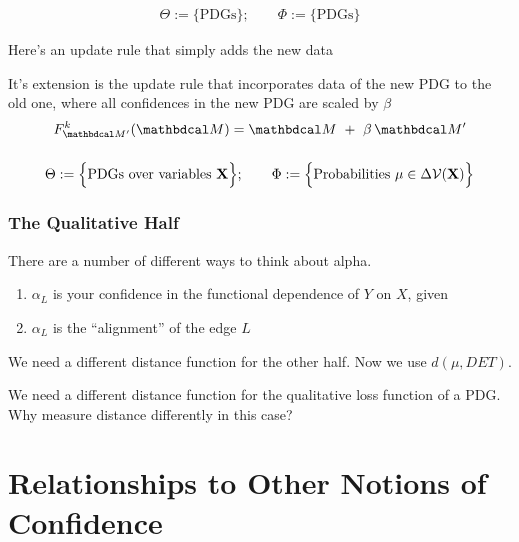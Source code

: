 \documentclass{article}
\begin{document}
\subsubsection{}
\begin{align*}
    \Theta :=
        \Big\{ 
        \text{PDGs}
        \Big\}; \qquad
    \Phi := \Big\{ \text{PDGs} \Big\}
\end{align*}


Here's an update rule that simply adds the new data

It's extension is the update rule that incorporates data of the new PDG to the old one, where all confidences in the new PDG are scaled by $\beta$
\[
    F^{k}_{\dg M'}(\dg M) = \dg M ~+~ \beta\,\dg M'
\]

\subsubsection{}
\begin{align*}
    \Theta :=
        \Big\{ 
        \text{PDGs over variables } \mathbf{X}
        \Big\}; \qquad
    \Phi := \Big\{ 
        \text{Probabilities}~ \mu \in \Delta \mathcal V(\mathbf{X})
        \Big\} 
\end{align*}


\subsubsection*{The Qualitative Half}


There are a number of different ways to think about alpha.
\begin{enumerate}[nosep]
    \item $\alpha_L$ is your confidence in the functional dependence of $Y$ on $X$, given
    \item $\alpha_L$ is the ``alignment'' of the edge $L$
\end{enumerate}

We need a different distance function for the other half. Now we use
$d(\mu, DET)$.

%

We need a different distance function for the qualitative loss function of a PDG.
Why measure distance differently in this case?


\section{Relationships to Other Notions of Confidence}
\end{document}
